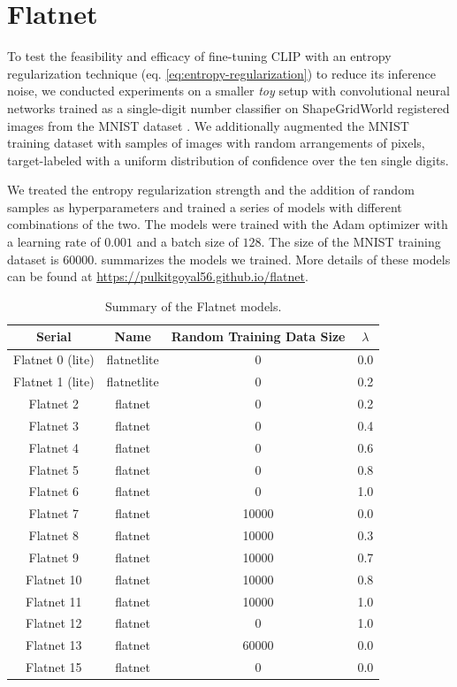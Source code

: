 \chapter{Flatnet}
\label{sec:flatnet}
To test the feasibility and efficacy of fine-tuning CLIP with an entropy regularization technique (eq. \ref{eq:entropy-regularization}) to reduce its inference noise, we conducted experiments on a smaller \emph{toy} setup with convolutional neural networks trained as a single-digit number classifier on ShapeGridWorld registered images from the MNIST dataset \citep{mnist}.
We additionally augmented the MNIST training dataset with samples of images with random arrangements of pixels, target-labeled with a uniform distribution of confidence over the ten single digits.

We treated the entropy regularization strength and the addition of random samples as hyperparameters and trained a series of models with different combinations of the two.
The models were trained with the Adam optimizer \citep{adam} with a learning rate of \(0.001\) and a batch size of \(128\). The size of the MNIST training dataset is \(60000\).
 summarizes the models we trained.
More details of these models can be found at \url{https://pulkitgoyal56.github.io/flatnet}.

\begin{table}[H]
    \centering
    \caption{Summary of the Flatnet models.}
    \begin{tabularx}{0.7\textwidth}{c c c c}
    \hline
        Serial & Name & Random Training Data Size & \(\lambda\) \\ \hline
        Flatnet 0 (lite) & flatnetlite & 0 & 0.0 \\ \hline
        Flatnet 1 (lite) & flatnetlite & 0 & 0.2 \\ \hline
        Flatnet 2 & flatnet & 0 & 0.2 \\ \hline
        Flatnet 3 & flatnet & 0 & 0.4 \\ \hline
        Flatnet 4 & flatnet & 0 & 0.6 \\ \hline
        Flatnet 5 & flatnet & 0 & 0.8 \\ \hline
        Flatnet 6 & flatnet & 0 & 1.0 \\ \hline
        Flatnet 7 & flatnet & 10000 & 0.0 \\ \hline
        Flatnet 8 & flatnet & 10000 & 0.3 \\ \hline
        Flatnet 9 & flatnet & 10000 & 0.7 \\ \hline
        Flatnet 10 & flatnet & 10000 & 0.8 \\ \hline
        Flatnet 11 & flatnet & 10000 & 1.0 \\ \hline
        Flatnet 12 & flatnet & 0 & 1.0 \\ \hline
        Flatnet 13 & flatnet & 60000 & 0.0 \\ \hline
        Flatnet 15 & flatnet & 0 & 0.0 \\ \hline
    \end{tabularx}
    \label{tab:flatnet-models}
\end{table}

